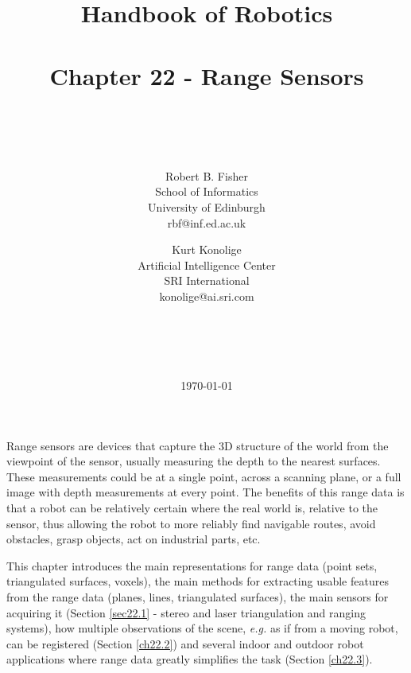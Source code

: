 \documentclass[twocolumn,oneside]{book}
\begin{document}
\title{\LARGE{Handbook of Robotics\\
~\\
Chapter 22 - Range Sensors}\\
~\\
~}

\author{Robert B. Fisher\\
School of Informatics\\
University of Edinburgh\\
rbf@inf.ed.ac.uk\\
\and
Kurt Konolige\\
Artificial Intelligence Center\\
SRI International\\
konolige@ai.sri.com\\
\\
\\
\\
\\
}

\date{\today}

\maketitle


\tableofcontents


\setcounter{page}{1}

\setcounter{chapter}{22}

Range sensors are devices that capture the 3D structure of the world
from the viewpoint of the sensor, usually measuring the depth to the
nearest surfaces. These measurements could be at a single point,
across a scanning plane, or a full image with depth measurements at
every point.
The benefits of this range data is that a robot can be relatively 
certain where the real world is, relative to the sensor, thus allowing
the robot to more reliably find navigable routes, avoid obstacles,
grasp objects, act on industrial parts, etc.

This chapter introduces the main representations for range data 
(point sets, triangulated surfaces, voxels), the main methods 
for extracting usable features from the range data (planes, lines, triangulated surfaces),
the main sensors for acquiring it (Section \ref{sec22.1} -
stereo and laser triangulation and ranging systems),
how multiple observations of the scene, {\it e.g.} as if from a 
moving robot, can be registered (Section \ref{ch22.2})
and several indoor and outdoor robot applications where
range data greatly simplifies the task (Section \ref{ch22.3}).
\end{document}
